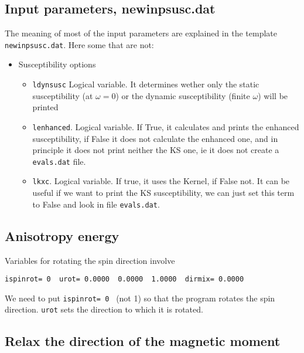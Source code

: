 \documentclass[a4paper,10pt,fullpage]{report}
\begin{document}
\subsection*{Input parameters, newinpsusc.dat}
The meaning of most of the input parameters are explained in the 
template \verb|newinpsusc.dat|. Here some that are not:

\begin{itemize}

\item Susceptibility options

\begin{itemize}
\item \verb|ldynsusc| Logical variable. It determines wether only the static susceptibility (at $\omega=0$) 
or the dynamic susceptibility (finite $\omega$) will be printed

 \item \verb|lenhanced|. Logical variable. If True, it calculates and prints the enhanced susceptibility,
 if False it does not calculate the enhanced one, and in principle it does not print neither the KS one,
 ie it does not create a \verb|evals.dat| file.
 
 \item \verb|lkxc|. Logical variable. If true, it uses the Kernel, if False not. It can be useful if
 we want to print the KS susceptibility, we can just set this term to False and look in file 
 \verb|evals.dat|. 
\end{itemize}

\end{itemize}


\subsection*{Anisotropy energy}

Variables for rotating the spin direction involve 
\begin{verbatim}
ispinrot= 0  urot= 0.0000  0.0000  1.0000  dirmix= 0.0000
\end{verbatim}
We need to put \verb|ispinrot= 0 | (not 1) so that the program rotates
the spin direction.  \verb|urot| sets the direction to which it is rotated.

\subsection*{Relax the direction of the magnetic moment}
\end{document}
